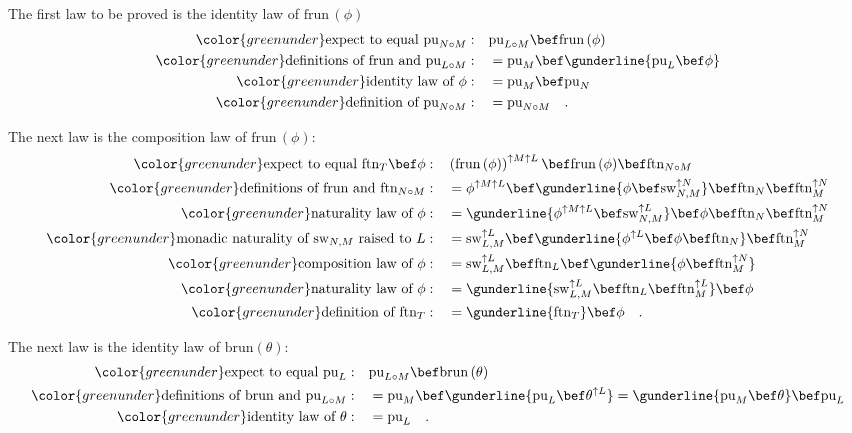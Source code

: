 The first law to be proved is the identity law of $\text{frun}\,(\phi)$
\begin{align*}
{\color{greenunder}\text{expect to equal }\text{pu}_{N\circ M}:}\quad & \text{pu}_{L\circ M}\bef\text{frun}\,(\phi)\\
{\color{greenunder}\text{definitions of }\text{frun}\text{ and }\text{pu}_{L\circ M}:}\quad & =\text{pu}_{M}\bef\gunderline{\text{pu}_{L}\bef\phi}\\
{\color{greenunder}\text{identity law of }\phi:}\quad & =\text{pu}_{M}\bef\text{pu}_{N}\\
{\color{greenunder}\text{definition of }\text{pu}_{N\circ M}:}\quad & =\text{pu}_{N\circ M}\quad.
\end{align*}

The next law is the composition law of $\text{frun}\,(\phi)$:
\begin{align*}
{\color{greenunder}\text{expect to equal }\text{ftn}_{T}\bef\phi:}\quad & \left(\text{frun}\,(\phi)\right)^{\uparrow M\uparrow L}\bef\text{frun}\,(\phi)\bef\text{ftn}_{N\circ M}\\
{\color{greenunder}\text{definitions of }\text{frun}\text{ and }\text{ftn}_{N\circ M}:}\quad & =\phi^{\uparrow M\uparrow L}\bef\gunderline{\phi\bef\text{sw}_{N,M}^{\uparrow N}}\bef\text{ftn}_{N}\bef\text{ftn}_{M}^{\uparrow N}\\
{\color{greenunder}\text{naturality law of }\phi:}\quad & =\gunderline{\phi^{\uparrow M\uparrow L}\bef\text{sw}_{N,M}^{\uparrow L}}\bef\phi\bef\text{ftn}_{N}\bef\text{ftn}_{M}^{\uparrow N}\\
{\color{greenunder}\text{monadic naturality of }\text{sw}_{N,M}\text{ raised to }L:}\quad & =\text{sw}_{L,M}^{\uparrow L}\bef\gunderline{\phi^{\uparrow L}\bef\phi\bef\text{ftn}_{N}}\bef\text{ftn}_{M}^{\uparrow N}\\
{\color{greenunder}\text{composition law of }\phi:}\quad & =\text{sw}_{L,M}^{\uparrow L}\bef\text{ftn}_{L}\bef\gunderline{\phi\bef\text{ftn}_{M}^{\uparrow N}}\\
{\color{greenunder}\text{naturality law of }\phi:}\quad & =\gunderline{\text{sw}_{L,M}^{\uparrow L}\bef\text{ftn}_{L}\bef\text{ftn}_{M}^{\uparrow L}}\bef\phi\\
{\color{greenunder}\text{definition of }\text{ftn}_{T}:}\quad & =\gunderline{\text{ftn}_{T}}\bef\phi\quad.
\end{align*}

The next law is the identity law of $\text{brun}\left(\theta\right)$:
\begin{align*}
{\color{greenunder}\text{expect to equal }\text{pu}_{L}:}\quad & \text{pu}_{L\circ M}\bef\text{brun}\,(\theta)\\
{\color{greenunder}\text{definitions of }\text{brun}\text{ and }\text{pu}_{L\circ M}:}\quad & =\text{pu}_{M}\bef\gunderline{\text{pu}_{L}\bef\theta^{\uparrow L}}=\gunderline{\text{pu}_{M}\bef\theta}\bef\text{pu}_{L}\\
{\color{greenunder}\text{identity law of }\theta:}\quad & =\text{pu}_{L}\quad.
\end{align*}

